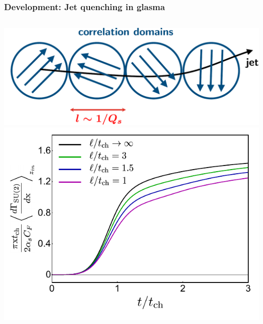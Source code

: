\documentclass[aspectratio=169,11pt,usenames,dvipsnames]{beamer}
\begin{document}
\begin{frame}[noframenumbering]
    \frametitle{{\normalsize\color{jyured}\bfseries\sffamily Development: }Jet quenching in glasma}
    \vspace{-15pt}
    \begin{center}
        \begin{columns}[onlytextwidth,t]
            \vspace{5pt}
            \begin{center}
                \includegraphics[width=0.88\columnwidth]{images/glasma_corr_dom_jet.pdf}
                \\[5pt]
                \includegraphics[width=0.95\columnwidth]{images/jeteloss.pdf}
            \end{center}


\end{columns}
\end{center}
\end{frame}
\end{document}
